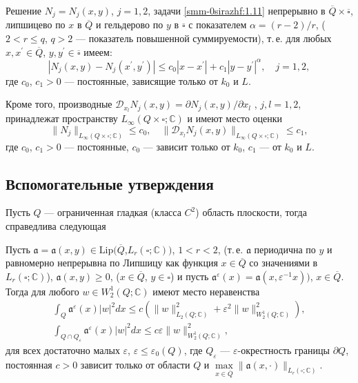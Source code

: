 \begin{corollary}
{Решение $N_j=N_j(x,y)$, $j=1,2$, задачи \eqref{smm-0sirazhf:1.11} непрерывно в $\overline{Q}\times\overline\square$,
	липшицево по $x$ в $\overline{Q}$ и гельдерово по $y$ в $\overline\square$ с показателем $\alpha=(r-2)/r$,
	($2<r\leqslant q$,  $q>2$ --- показатель повышенной суммируемости), т.\,е. для любых
	$x, x^\prime \in \overline{Q}$,  $y, y^\prime \in \overline\square$ имеем:}
\begin{equation}\label{smm-0sirazhdf:1.18}
	|N_j(x,y)-N_j(x^\prime,y^\prime)|\leqslant c_0|x-x^\prime|+c_1|y-y^\prime|^\alpha, \quad j=1,2,
\end{equation}
{где $c_0$, $c_1>0$ --- постоянные, зависящие только от $k_0$ и $L$.}

{ Кроме того, производные $\mathscr{D}_{x_l} N_j(x,y)={\partial N_j(x,y)}/{\partial x_l}$ , $j,l=1,2$,  принадлежат
	пространству $L_\infty(Q\times\square;\mathbb{C})$  и имеют место оценки}
\begin{equation}\label{smm-0sirazhdf:1.19}
	\|N_j\|_{L_\infty(Q\times\square;\mathbb{C})}\leqslant c_0,\quad \|
	\mathscr{D}_{x_l} N_j(x,y)\|_{L_\infty(Q\times\square;\mathbb{C})} \leqslant c_1,
\end{equation}
{ где $c_0$, $c_1>0$ --- постоянные, $c_0$ --- зависит только от $k_0$, $c_1$ --- от $k_0$ и $L$.}
\end{corollary}


\subsection{Вспомогательные утверждения}

Пусть $Q$ --- ограниченная гладкая (класса $C^2$) область плоскости,
тогда справедлива следующая

\begin{lemma}
{ Пусть $\mathfrak{a}=\mathfrak{a}(x,y)\in \text{Lip}(\overline{Q}$,$L_r (\square;\mathbb{C}))$, $1<r<2$, (т.\,е. $\mathfrak{a}$  периодична по
	$y$ и равномерно непрерывна  по Липшицу как функция $x\in\overline{Q}$
	со значениями в $L_r (\square;\mathbb{C})$),  $\mathfrak{a}(x,y)\geqslant
	0$, {($x\in\overline{Q}$, $y\in\square$)}  и пусть  $\mathfrak{a}^\varepsilon(x)
	=\mathfrak{a}(x,\varepsilon^{-1} x))$, $x\in\overline{Q}$. Тогда для
	любого $w\in W_2^1 (Q;\mathbb{C})$ имеют место неравенства
	\begin{gather}\label{smm-0sirazhVf:1}
		\int_Q\mathfrak{a}^\varepsilon(x) |w|^2 dx\leqslant c\left(\|w\|_{L_2 (Q;\mathbb{C})}^2+
		\varepsilon^2 \|w\|_{W_2^1 (Q;\mathbb C)}^2 \right),  \\
		\label{smm-0sirazhVf:2}
		\int_{Q\cap Q_\varepsilon}\mathfrak{a}^\varepsilon(x) |w|^2 dx\leqslant c\varepsilon\|w\|_{W_2^1 (Q;\mathbb{C})}^2,
	\end{gather}
	для всех достаточно малых $\varepsilon$, $\varepsilon\leqslant\varepsilon_0
	(Q)$,
	где $Q_\varepsilon$ --- $\varepsilon$-окрестность границы $\partial Q$,
	постоянная $c>0$ зависит только от области $Q$ и $\mathop{ max}\limits_{x\in\overline{Q}}\|
	\mathfrak{a}(x,\cdot)\|_{L_r (\square;\mathbb C)}$}.
\end{lemma}


